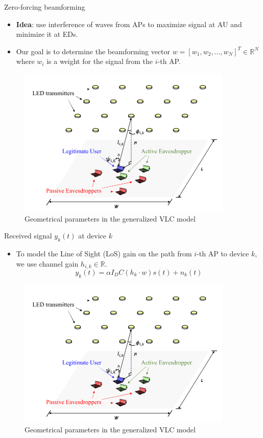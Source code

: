 \documentclass[aspectratio=169,xcolor=dvipsnames]{beamer}
\begin{document}
	\begin{frame}{Zero-forcing beamforming}
		\begin{itemize}
			\item \textbf{Idea}: use interference of waves from APs to maximize signal at AU and minimize it at EDs.
			\item Our goal is to determine the beamforming vector $w = [w_1,w_2,...,w_N]^T \in \mathbb{R}^N$ where $w_i$ is a weight for the signal from the $i$-th AP.
		\end{itemize}
		\begin{figure}[h!]
			\centering
			\includegraphics[scale=0.8]{../../geometry.PNG}
			\caption{Geometrical parameters in the generalized VLC model \cite{Oxford2021}}
		\end{figure}
	\end{frame}
	
	\begin{frame}{Received signal $y_k(t)$ at device $k$}
		\begin{itemize}
			\item To model the Line of Sight (LoS) gain on the path from $i$-th AP to device $k$, we use channel gain $h_{i,k} \in \mathbb{R}$.
			\begin{equation}
				y_k(t) = \alpha I_DC (h_k \cdot w) s(t) + n_k(t)
			\end{equation}
		\end{itemize}
		\begin{figure}[h!]
			\centering
			\includegraphics[scale=0.8]{../../geometry.PNG}
			\caption{Geometrical parameters in the generalized VLC model \cite{Oxford2021}}
		\end{figure}
	\end{frame}
	
\end{document}
